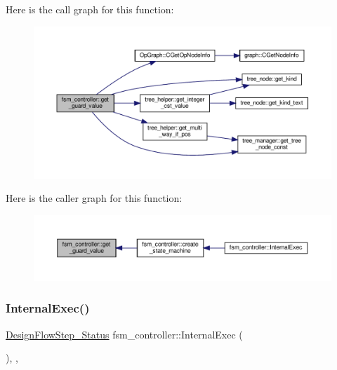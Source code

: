 Here is the call graph for this function\+:
\nopagebreak
\begin{figure}[H]
\begin{center}
\leavevmode
\includegraphics[width=350pt]{da/d3d/classfsm__controller_ac82a6e93ab9750f50a8565b72e1a028b_cgraph}
\end{center}
\end{figure}
Here is the caller graph for this function\+:
\nopagebreak
\begin{figure}[H]
\begin{center}
\leavevmode
\includegraphics[width=350pt]{da/d3d/classfsm__controller_ac82a6e93ab9750f50a8565b72e1a028b_icgraph}
\end{center}
\end{figure}
\mbox{\label{classfsm__controller_a7fd76ef3d980cdcc8451bfd2e3ea3537}} 
\subsubsection{\texorpdfstring{Internal\+Exec()}{InternalExec()}}
{\footnotesize\ttfamily \hyperlink{design__flow__step_8hpp_afb1f0d73069c26076b8d31dbc8ebecdf}{Design\+Flow\+Step\+\_\+\+Status} fsm\+\_\+controller\+::\+Internal\+Exec (\begin{DoxyParamCaption}{ }\end{DoxyParamCaption})\hspace{0.3cm}{\ttfamily [override]}, {\ttfamily [private]}, {\ttfamily [virtual]}}



